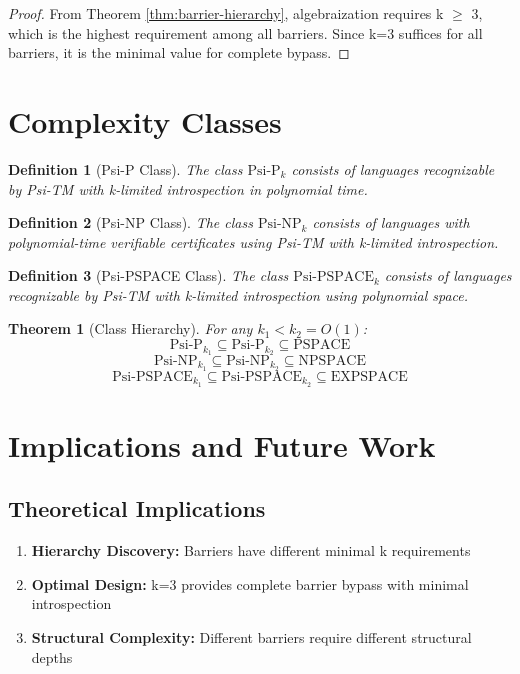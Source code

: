 \documentclass[11pt]{article}
\newtheorem{theorem}{Theorem}
\newtheorem{definition}{Definition}
\begin{document}
\begin{proof}
From Theorem \ref{thm:barrier-hierarchy}, algebraization requires k $\geq$ 3, which is the highest requirement among all barriers. Since k=3 suffices for all barriers, it is the minimal value for complete bypass.
\end{proof}

\section{Complexity Classes}

\begin{definition}[Psi-P Class]
The class $\text{Psi-P}_k$ consists of languages recognizable by Psi-TM with k-limited introspection in polynomial time.
\end{definition}

\begin{definition}[Psi-NP Class]
The class $\text{Psi-NP}_k$ consists of languages with polynomial-time verifiable certificates using Psi-TM with k-limited introspection.
\end{definition}

\begin{definition}[Psi-PSPACE Class]
The class $\text{Psi-PSPACE}_k$ consists of languages recognizable by Psi-TM with k-limited introspection using polynomial space.
\end{definition}

\begin{theorem}[Class Hierarchy]
For any $k_1 < k_2 = O(1)$:
$$\text{Psi-P}_{k_1} \subseteq \text{Psi-P}_{k_2} \subseteq \text{PSPACE}$$
$$\text{Psi-NP}_{k_1} \subseteq \text{Psi-NP}_{k_2} \subseteq \text{NPSPACE}$$
$$\text{Psi-PSPACE}_{k_1} \subseteq \text{Psi-PSPACE}_{k_2} \subseteq \text{EXPSPACE}$$
\end{theorem}

\section{Implications and Future Work}

\subsection{Theoretical Implications}

\begin{enumerate}
\item \textbf{Hierarchy Discovery:} Barriers have different minimal k requirements
\item \textbf{Optimal Design:} k=3 provides complete barrier bypass with minimal introspection
\item \textbf{Structural Complexity:} Different barriers require different structural depths
\end{enumerate}
\end{document}
